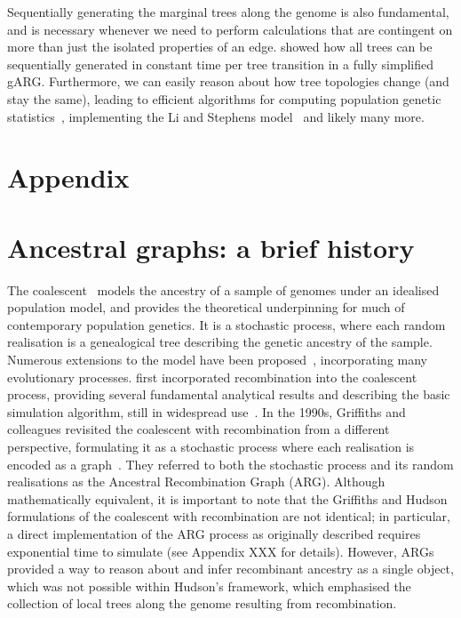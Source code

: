 \documentclass{article}
\begin{document}
Sequentially generating the marginal trees along the genome
is also fundamental, and is necessary whenever we need to
perform calculations that are contingent on more than just the
isolated properties of an edge. \cite{kelleher2016efficient}
showed how all trees can be sequentially generated in
constant time per tree transition in a fully simplified gARG.
Furthermore, we can easily reason about how tree topologies
change (and stay the same), leading to efficient algorithms
for computing population genetic
statistics~\citep{kelleher2016efficient,kelleher2018efficient},
implementing the Li and Stephens
model~\citep{kelleher2019inferring,wohns2022unified}
and likely many more.





\setcounter{secnumdepth}{2} %

\section*{Appendix}
\appendix

\section{Ancestral graphs: a brief history}
\label{sec-arg-history}
The coalescent~\citep{kingman1982coalescent,kingman1982genealogy,
hudson1983testing, tajima1983evolutionary} models the ancestry of a sample of
genomes under an idealised population model, and provides the theoretical
underpinning for much of contemporary population genetics.
It is a stochastic process, where each random realisation
is a genealogical tree describing the genetic ancestry of the sample.
Numerous extensions to the model have been
proposed~\citep{hudson1990gene,hein2004gene,wakely2008coalescent},
incorporating many evolutionary processes.
\citet{hudson1983properties}
first incorporated recombination into the coalescent process,
providing several fundamental analytical results
and describing the basic simulation algorithm, still in
widespread use~\citep{hudson2002generating,kelleher2016efficient,
baumdicker2021efficient}.
In the 1990s, Griffiths and colleagues revisited the
coalescent with recombination from a different perspective,
formulating it as a stochastic process where each realisation
is encoded as a graph~\citep{griffiths1991two,ethier1990two,
griffiths1996ancestral,griffiths1997ancestral}.
They referred to both the stochastic process and
its random realisations as the Ancestral Recombination Graph (ARG).
Although mathematically equivalent, it is
important to note that the Griffiths and Hudson formulations of
the coalescent with recombination are not identical;
in particular, a direct implementation of the ARG process
as originally described requires exponential time to simulate
(see Appendix XXX for details). However, ARGs provided a way
to reason about and infer recombinant ancestry as a single object,
which was not possible within Hudson's framework, which emphasised
the collection of local trees along the genome resulting from recombination.
\end{document}
